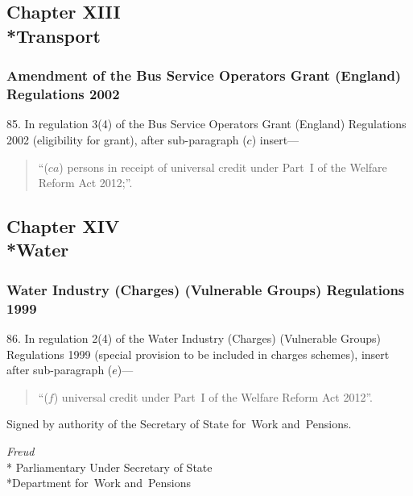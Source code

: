\documentclass[12pt,a4paper]{article}
\begin{document}
\subsection[Chapter XIII --- Transport]{Chapter XIII\\*Transport}

\renewcommand\parthead{--- Part III Chapter XIII}

\subsubsection[85. Amendment of the Bus Service Operators Grant (England) Regulations 2002]{Amendment of the Bus Service Operators Grant (England) Regulations 2002}

85.  In regulation 3(4) of the Bus Service Operators Grant (England) Regulations 2002 (eligibility for grant), after sub-paragraph ($c$)  insert—
\begin{quotation}
“($ca$) persons in receipt of universal credit under Part~I of the Welfare Reform Act 2012;”.
\end{quotation}

\subsection[Chapter XIV --- Water]{Chapter XIV\\*Water}

\renewcommand\parthead{--- Part III Chapter XIV}

\subsubsection[86. Water Industry (Charges) (Vulnerable Groups) Regulations 1999]{Water Industry (Charges) (Vulnerable Groups) Regulations 1999}

86.  In regulation 2(4) of the Water Industry (Charges) (Vulnerable Groups) Regulations 1999 (special provision to be included in charges schemes), insert after sub-paragraph ($e$)—
\begin{quotation}
“($f$) universal credit under Part~I of the Welfare Reform Act 2012”.
\end{quotation}

\bigskip

\pagebreak[3]

Signed 
by authority of the 
Secretary of State for~Work and~Pensions.

{\raggedleft
\emph{Freud}\\*
Parliamentary Under Secretary 
of State\\*Department 
for~Work and~Pensions

}
\end{document}
